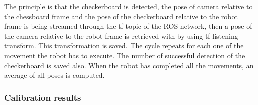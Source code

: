  The principle is that the checkerboard is detected, the pose of camera relative to the chessboard frame and the pose of the checkerboard relative to the robot frame is being streamed through the tf topic of  the ROS network, then a pose of the camera relative to the robot frame is retrieved with by using tf listening transform. This transformation is saved. The cycle repeats for each one of the movement the robot has to execute. The number of successful detection of the checkerboard is saved also. When the robot has completed all the movements, an average of all poses is computed. 


\subsubsection{Calibration results}


